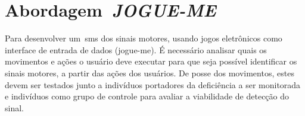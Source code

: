 \chapter{Abordagem~\textit{JOGUE-ME}}\label{chapter:abordagem_gahme}
Para desenvolver um~\ac{sms} dos sinais motores, usando jogos eletrônicos como interface de entrada de dados (\ac{jogue-me}). É necessário analisar quais os movimentos e ações o usuário deve executar para que seja possível identificar os sinais motores, a partir das ações dos usuários. De posse dos movimentos, estes devem ser testados junto a indivíduos portadores da deficiência a ser monitorada e indivíduos como grupo de controle para avaliar a viabilidade de detecção do sinal.






%

